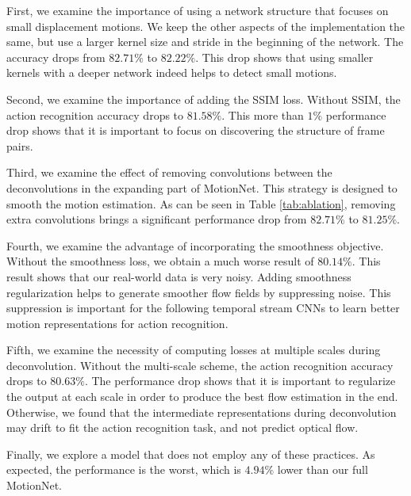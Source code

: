 \documentclass[runningheads]{llncs}
\begin{document}
		First, we examine the importance of using a network structure that focuses on small displacement motions. We keep the other aspects of the implementation the same, but use a larger kernel size and stride in the beginning of the network. The accuracy drops from $82.71\%$ to $82.22\%$. This drop shows that using smaller kernels with a deeper network indeed helps to detect small motions. 
		
		Second, we examine the importance of adding the SSIM loss. Without SSIM, the action recognition accuracy drops to $81.58\%$. This more than $1\%$ performance drop shows that it is important to focus on discovering the structure of frame pairs. 


		Third, we examine the effect of removing convolutions between the deconvolutions in the expanding part of MotionNet. This strategy is designed to smooth the motion estimation. As can be seen in Table \ref{tab:ablation}, removing extra convolutions brings a significant performance drop from $82.71\%$ to $81.25\%$.
		
		Fourth, we examine the advantage of incorporating the smoothness objective. Without the smoothness loss, we obtain a much worse result of $80.14\%$. This result shows that our real-world data is very noisy.  Adding smoothness regularization helps to generate smoother flow fields by suppressing noise. This suppression is important for the following temporal stream CNNs to learn better motion representations for action recognition. 
		
		{ \color{black} Fifth, we examine the necessity of computing losses at multiple scales during deconvolution. Without the multi-scale scheme, the action recognition accuracy drops to $80.63\%$. The performance drop shows that it is important to regularize the output at each scale in order to produce the best flow estimation in the end. Otherwise, we found that the intermediate representations during deconvolution may drift to fit the action recognition task, and not predict optical flow. }
		
		Finally, we explore a model that does not employ any of these practices. As expected, the performance is the worst, which is $4.94\%$ lower than our full MotionNet. 
		
\end{document}
